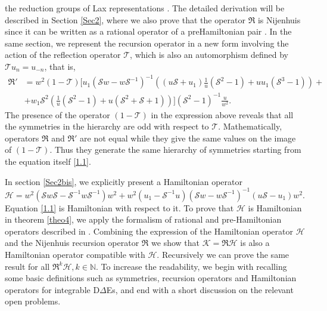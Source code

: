 \documentclass[fleqn,11pt,twoside]{article}
\theoremstyle{definition}
\begin{document}
the reduction groups of Lax representations \cite{31}.
The detailed derivation will be described in Section \ref{Sec2}, where
we also prove that the operator $\mathfrak{R}$ is Nijenhuis since it can
be written as a rational operator of a preHamiltonian pair \cite{4, 41}.
In the same section, we represent the recursion operator in a new form
involving the action of the reflection operator $\mathcal{T}$, which is also an automorphism defined by
$\mathcal{T} u_n = u_{-n}$, that is,
	\begin{equation}\label{RT}
		\begin{split}
			\mathfrak{R}' & = w^2 \left(1-\mathcal{T}\right) \Bigg[
u_1 \left( \mathcal{S} w - w \mathcal{S}^{-1} \right)^{-1} \left( \left( u
\mathcal{S}+u_1 \right)\frac{1}{u}\left( \mathcal{S}^2-1\right) + u
u_1\left(\mathcal{S}^3-1\right) \right)+ \\ & + w_1 \mathcal{S}^2 \left(\frac{1}{u}\left(\mathcal{S}^2-1\right)+u
\left(\mathcal{S}^2+\mathcal{S}+1\right)\right) \Bigg]
(\mathcal{S}^2-1)^{-1}\frac{u}{w^2} .
		\end{split}
	\end{equation}
The presence of the operator $\left(1- \mathcal{T}\right)$
in the expression above reveals that all the symmetries in the hierarchy are odd
with respect to $\mathcal{T}$. Mathematically, operators $\mathfrak{R}$ and $\mathfrak{R}'$
are not equal while they give the same values on the image of $\left(1- \mathcal{T}\right)$. Thus they generate
the same hierarchy of symmetries starting from the equation itself \eqref{1.1}.

In section \ref{Sec2bis}, we explicitly present a Hamiltonian operator
\begin{equation}
		\mathcal{H} = w^2 \left(\mathcal{S} w \mathcal{S} -
\mathcal{S}^{-1}w \mathcal{S}^{-1} \right) w^2+ w^2\left(u_1-\mathcal{S}^{-1}
u\right) \left(\mathcal{S} w - w \mathcal{S}^{-1}\right)^{-1} (u
\mathcal{S}-u_1) w^2 .
	\end{equation}
Equation \eqref{1.1} is Hamiltonian with respect to it.
To prove that $\mathcal{H}$ is Hamiltonian in theorem \ref{theo4}, we apply the formalism
of rational and pre-Hamiltonian operators described in \cite{4, 42}.
Combining the expression of the Hamiltonian operator
$\mathcal{H}$ and the Nijenhuis recursion operator $\mathfrak{R}$ we show that
 $\mathcal{K} = \mathfrak{R}\mathcal{H}$ is also a Hamiltonian operator compatible with $\mathcal{H}$.
 Recursively we can prove the same result for all $\mathfrak{R}^k\mathcal{H}, k\in \mathbb{N}.$
 To increase the readability, we begin with recalling some basic definitions such as symmetries, recursion operators and Hamiltonian operators for integrable D$\Delta$Es, and
 end with a short discussion on the relevant open problems.
\end{document}
